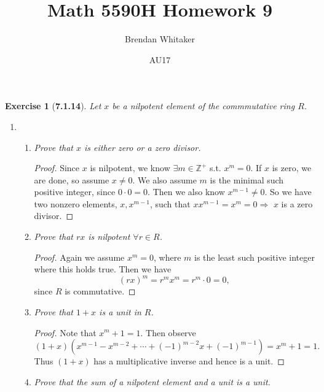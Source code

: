 \documentclass[10pt,oneside,reqno]{amsart}
\theoremstyle{plain}
\newtheorem*{e}{Exercise}
\theoremstyle{definition}
\begin{document}
\title{Math 5590H Homework 9}

\date{AU17}

\author[Brendan Whitaker]{Brendan Whitaker}

\maketitle

\begin{e}[\textbf{7.1.14}]
Let $x$ be a nilpotent element of the commmutative ring $R$. 
\end{e}
\begin{enumerate}
\item[]
\begin{enumerate}
\item \textit{Prove that $x$ is either zero or a zero divisor. }
\begin{proof}
\vspace{3mm}
Since $x$ is nilpotent, we know $\exists m \in \mathbb{Z}^+$ s.t. $x^m = 0$. If $x$ is zero, we are done, so assume $x \neq 0$. We also assume $m$ is the minimal such positive integer, since $0 \cdot 0 = 0$. Then we also know $x^{m - 1} \neq 0$. So we have two nonzero elements, $x,x^{m - 1}$, such that $xx^{m - 1} = x^{m} = 0 \Rightarrow$ $x$ is a zero divisor. 
\end{proof}
\vspace{3mm}
\item 
\textit{Prove that $rx$ is nilpotent $\forall r \in R$. }

\begin{proof}
\vspace{3mm}
Again we assume $x^m = 0$, where $m$ is the least such positive integer where this holds true. Then we have
\[(rx)^m = r^mx^m = r^m \cdot 0 = 0,\]
since $R$ is commutative. 
\end{proof}
\vspace{3mm}
\item \textit{Prove that $1+ x$ is a unit in $R$. }
\begin{proof}
\vspace{3mm}
Note that $x^m + 1 = 1$. Then observe \[(1 + x)(x^{m - 1} - x^{m - 2} + \cdots + (-1)^{m - 2}x + (-1)^{m - 1}) = x^m + 1 = 1.\]
Thus $(1 + x)$ has a multiplicative inverse and hence is a unit. 
\end{proof}
\vspace{3mm}
\item \textit{Prove that the sum of a nilpotent element and a unit is a unit. }


\end{enumerate}
\end{enumerate}
\end{document}

